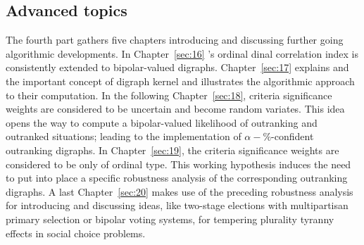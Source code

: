 % 
%
%

\begin{partbacktext}
\part{Advanced topics}
\noindent The fourth part gathers five chapters introducing and discussing further going algorithmic developments. In Chapter~\vref{sec:16} \Kendall's ordinal dinal correlation index is consistently extended to bipolar-valued digraphs. Chapter~\vref{sec:17} explains and the important concept of digraph kernel and illustrates the \Digraph algorithmic approach to their computation. In the following Chapter~\vref{sec:18}, criteria significance weights are considered to be uncertain and become random variates. This idea opens the way to compute a bipolar-valued likelihood of outranking and outranked situations; leading to the implementation of $\alpha-\%$-confident outranking digraphs. In Chapter~\vref{sec:19}, the criteria significance weights are considered to be only of ordinal type. This working hypothesis induces the need to put into place a specific robustness analysis of the corresponding outranking digraphs. A last Chapter~\vref{sec:20} makes use of the preceding robustness analysis for introducing and discussing ideas, like two-stage elections with multipartisan primary selection or bipolar voting systems, for tempering plurality tyranny effects in social choice problems.

\end{partbacktext}